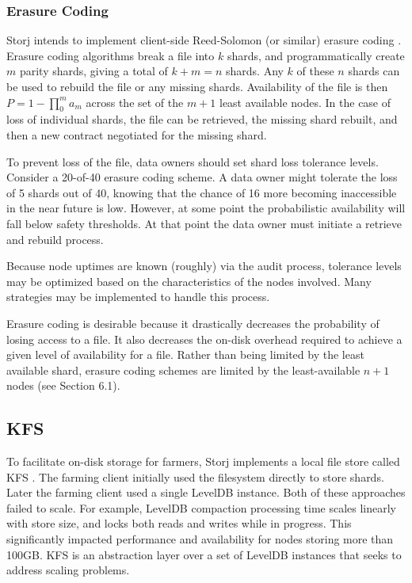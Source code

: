 \documentclass[a4paper,10pt]{article}
\begin{document}
\subsubsection{Erasure Coding}
Storj intends to implement client-side Reed-Solomon (or similar) erasure coding \cite{27}. Erasure coding algorithms break a file into $ k $ shards, and programmatically create $ m $ parity shards, giving a total of $ k + m = n $ shards. Any $ k $ of these $ n $ shards can be used to rebuild the file or any missing shards. Availability of the file is then $ P = 1 - \prod_{0}^{m} a_{m} $  across the set of the $m + 1$ least available nodes. In the case of loss of individual shards, the file can be retrieved, the missing shard rebuilt, and then a new contract negotiated for the missing shard.

To prevent loss of the file, data owners should set shard loss tolerance levels. Consider a 20-of-40 erasure coding scheme. A data owner might tolerate the loss of 5 shards out of 40, knowing that the chance of 16 more becoming inaccessible in the near future is low. However, at some point the probabilistic availability will fall below safety thresholds. At that point the data owner must initiate a retrieve and rebuild process.

Because node uptimes are known (roughly) via the audit process, tolerance levels may be optimized based on the characteristics of the nodes involved. Many strategies may be implemented to handle this process.

Erasure coding is desirable because it drastically decreases the probability of losing access to a file. It also decreases the on-disk overhead required to achieve a given level of availability for a file. Rather than being limited by the least available shard, erasure coding schemes are limited by the least-available $ n + 1 $ nodes (see Section 6.1).

\subsection{KFS}
To facilitate on-disk storage for farmers, Storj implements a local file store called KFS \cite{12}. The farming client initially used the filesystem directly to store shards. Later the farming client used a single LevelDB instance. Both of these approaches failed to scale. For example, LevelDB compaction processing time scales linearly with store size, and locks both reads and writes while in progress. This significantly impacted performance and availability for nodes storing more than 100GB. KFS is an abstraction layer over a set of LevelDB instances that seeks to address scaling problems.
\end{document}
